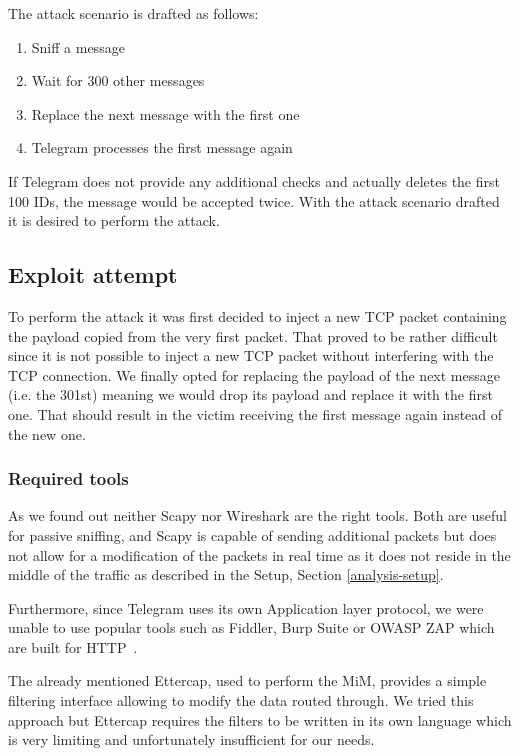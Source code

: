 \documentclass[thesis=M,english]{FITthesis}[2012/10/20]
\begin{document}
The attack scenario is drafted as follows:

\begin{enumerate}
	\item Sniff a message
	\item Wait for 300 other messages
	\item Replace the next message with the first one
	\item Telegram processes the first message again
\end{enumerate}

If Telegram does not provide any additional checks and actually deletes the first 100 IDs, the message would be accepted twice. With the attack scenario drafted it is desired to perform the attack.

\subsection{Exploit attempt}

To perform the attack it was first decided to inject a new TCP packet containing the payload copied from the very first packet. That proved to be rather difficult since it is not possible to inject a new TCP packet without interfering with the TCP connection. We finally opted for replacing the payload of the next message (i.e. the 301st) meaning we would drop its payload and replace it with the first one. That should result in the victim receiving the first message again instead of the new one.

\subsubsection{Required tools}

As we found out neither Scapy nor Wireshark are the right tools. Both are useful for passive sniffing, and Scapy is capable of sending additional packets but does not allow for a modification of the packets in real time as it does not reside in the middle of the traffic as described in the Setup, Section \ref{analysis-setup}.

Furthermore, since Telegram uses its own Application layer protocol, we were unable to use popular tools such as Fiddler, Burp Suite or OWASP ZAP which are built for HTTP~\cite{fiddler-homepage, burp-homepage}.

The already mentioned Ettercap, used to perform the MiM, provides a simple filtering interface allowing to modify the data routed through. We tried this approach but Ettercap requires the filters to be written in its own language which is very limiting and unfortunately insufficient for our needs.
\end{document}

